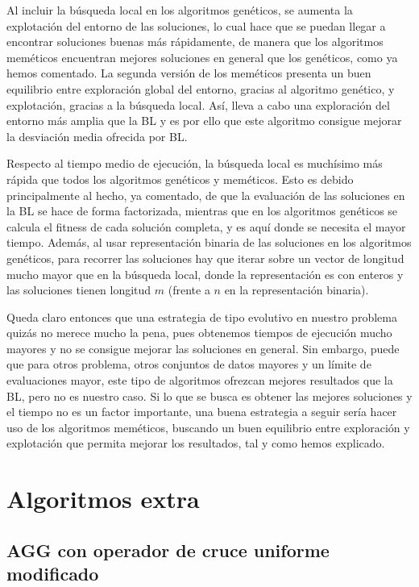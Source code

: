 \documentclass[10pt,a4paper]{article}
\begin{document}
	Al incluir la búsqueda local en los algoritmos genéticos, se aumenta la explotación del entorno de las soluciones, lo cual hace que se puedan llegar a encontrar soluciones buenas más rápidamente, de manera que los algoritmos meméticos encuentran mejores soluciones en general que los genéticos, como ya hemos comentado. La segunda versión de los meméticos presenta un buen equilibrio entre exploración global del entorno, gracias al algoritmo genético, y explotación, gracias a la búsqueda local. Así, lleva a cabo una exploración del entorno más amplia que la BL y es por ello que este algoritmo consigue mejorar la desviación media ofrecida por BL. 
	
	Respecto al tiempo medio de ejecución, la búsqueda local es muchísimo más rápida que todos los algoritmos genéticos y meméticos. Esto es debido principalmente al hecho, ya comentado, de que la evaluación de las soluciones en la BL se hace de forma factorizada, mientras que en los algoritmos genéticos se calcula el fitness de cada solución completa, y es aquí donde se necesita el mayor tiempo. Además, al usar representación binaria de las soluciones en los algoritmos genéticos, para recorrer las soluciones hay que iterar sobre un vector de longitud mucho mayor que en la búsqueda local, donde la representación es con enteros y las soluciones tienen longitud $ m $ (frente a $ n $ en la representación binaria).
	
	Queda claro entonces que una estrategia de tipo evolutivo en nuestro problema quizás no merece mucho la pena, pues obtenemos tiempos de ejecución mucho mayores y no se consigue mejorar las soluciones en general. Sin embargo, puede que para otros problema, otros conjuntos de datos mayores y un límite de evaluaciones mayor, este tipo de algoritmos ofrezcan mejores resultados que la BL, pero no es nuestro caso. Si lo que se busca es obtener las mejores soluciones y el tiempo no es un factor importante, una buena estrategia a seguir sería hacer uso de los algoritmos meméticos, buscando un buen equilibrio entre exploración y explotación que permita mejorar los resultados, tal y como hemos explicado. 
	
\newpage
\section{Algoritmos extra}
\subsection{AGG con operador de cruce uniforme modificado}
\end{document}
